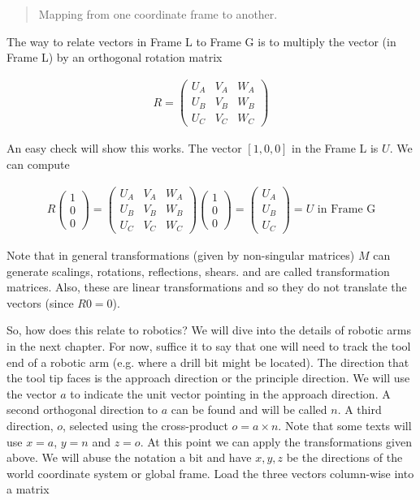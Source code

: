\begin{quote}
Mapping from one coordinate frame to another.
\end{quote}

The way to relate vectors in Frame L to Frame G is to multiply the
vector (in Frame L) by an orthogonal rotation matrix

\[\begin{aligned}
R = \begin{pmatrix}
U_A & V_A & W_A  \\
U_B & V_B & W_B \\
U_C & V_C & W_C  \end{pmatrix}
\end{aligned}\]

An easy check will show this works. The vector \([1,0,0]\) in the Frame
L is \(U\). We can compute

\[\begin{aligned}
R \begin{pmatrix} 1 \\ 0 \\ 0\end{pmatrix}
=
\begin{pmatrix}
U_A & V_A & W_A  \\
U_B & V_B & W_B \\
U_C & V_C & W_C  \end{pmatrix} \begin{pmatrix} 1 \\ 0 \\ 0\end{pmatrix}
=
\begin{pmatrix}
U_A   \\
U_B  \\
U_C  \end{pmatrix}
= U \mbox{  in Frame G}
\end{aligned}\]

Note that in general transformations (given by non-singular matrices)
\(M\) can generate scalings, rotations, reflections, shears. and are
called transformation matrices. Also, these are linear transformations
and so they do not translate the vectors (since \(R0 = 0\)).

So, how does this relate to robotics? We will dive into the details of
robotic arms in the next chapter. For now, suffice it to say that one
will need to track the tool end of a robotic arm (e.g. where a drill bit
might be located). The direction that the tool tip faces is the approach
direction or the principle direction. We will use the vector \(a\) to
indicate the unit vector pointing in the approach direction. A second
orthogonal direction to \(a\) can be found and will be called \(n\). A
third direction, \(o\), selected using the cross-product
\(o = a \times n\). Note that some texts will use \(x = a\), \(y = n\)
and \(z = o\). At this point we can apply the transformations given
above. We will abuse the notation a bit and have \(x, y, z\) be the
directions of the world coordinate system or global frame. Load the
three vectors column-wise into a matrix


